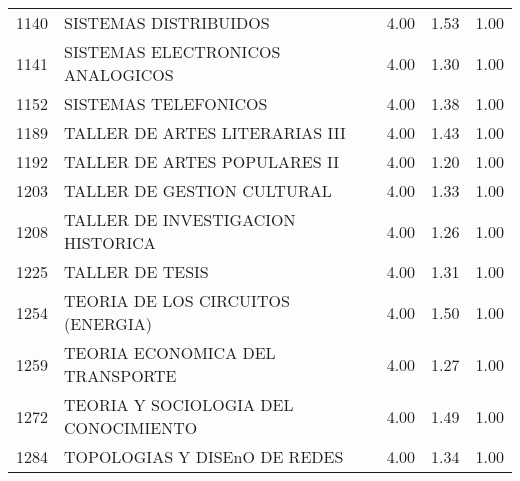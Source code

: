 \documentclass[12pt]{article}
\begin{document}
\begin{table}[ht]
\begin{tabular}{rlrrr}
  1140 & SISTEMAS DISTRIBUIDOS & 4.00 & 1.53 & 1.00 \\ 
  1141 & SISTEMAS ELECTRONICOS ANALOGICOS & 4.00 & 1.30 & 1.00 \\ 
  1152 & SISTEMAS TELEFONICOS & 4.00 & 1.38 & 1.00 \\ 
  1189 & TALLER DE ARTES LITERARIAS III & 4.00 & 1.43 & 1.00 \\ 
  1192 & TALLER DE ARTES POPULARES II & 4.00 & 1.20 & 1.00 \\ 
  1203 & TALLER DE GESTION CULTURAL & 4.00 & 1.33 & 1.00 \\ 
  1208 & TALLER DE INVESTIGACION HISTORICA & 4.00 & 1.26 & 1.00 \\ 
  1225 & TALLER DE TESIS & 4.00 & 1.31 & 1.00 \\ 
  1254 & TEORIA DE LOS CIRCUITOS (ENERGIA) & 4.00 & 1.50 & 1.00 \\ 
  1259 & TEORIA ECONOMICA DEL TRANSPORTE & 4.00 & 1.27 & 1.00 \\ 
  1272 & TEORIA Y SOCIOLOGIA DEL CONOCIMIENTO & 4.00 & 1.49 & 1.00 \\ 
  1284 & TOPOLOGIAS Y DISEnO DE REDES & 4.00 & 1.34 & 1.00 \\ 
   \hline
\end{tabular}
\end{table}
\end{document}

